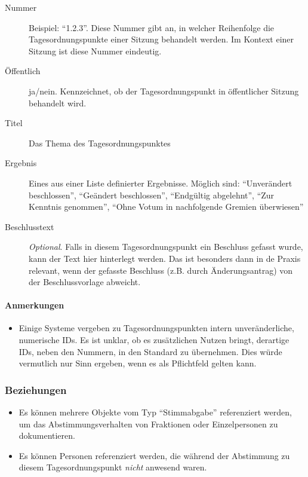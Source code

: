 \begin{description}
\item[Nummer]
Beispiel: ``1.2.3''. Diese Nummer gibt an, in welcher Reihenfolge die
Tagesordnungspunkte einer Sitzung behandelt werden. Im Kontext einer
Sitzung ist diese Nummer eindeutig.
\item[Öffentlich]
ja/nein. Kennzeichnet, ob der Tagesordnungspunkt in öffentlicher Sitzung
behandelt wird.
\item[Titel]
Das Thema des Tagesordnungspunktes
\item[Ergebnis]
Eines aus einer Liste definierter Ergebnisse. Möglich sind:
``Unverändert beschlossen'', ``Geändert beschlossen'', ``Endgültig
abgelehnt'', ``Zur Kenntnis genommen'', ``Ohne Votum in nachfolgende
Gremien überwiesen''
\item[Beschlusstext]
\emph{Optional}. Falls in diesem Tagesordnungspunkt ein Beschluss
gefasst wurde, kann der Text hier hinterlegt werden. Das ist besonders
dann in de Praxis relevant, wenn der gefasste Beschluss (z.B. durch
Änderungsantrag) von der Beschlussvorlage abweicht.
\end{description}

\paragraph{Anmerkungen}

\begin{itemize}
\item
  Einige Systeme vergeben zu Tagesordnungspunkten intern
  unveränderliche, numerische IDs. Es ist unklar, ob es zusätzlichen
  Nutzen bringt, derartige IDs, neben den Nummern, in den Standard zu
  übernehmen. Dies würde vermutlich nur Sinn ergeben, wenn es als
  Pflichtfeld gelten kann.
\end{itemize}

\subsubsection{Beziehungen}

\begin{itemize}
\item
  Es können mehrere Objekte vom Typ ``Stimmabgabe'' referenziert werden,
  um das Abstimmungsverhalten von Fraktionen oder Einzelpersonen zu
  dokumentieren.
\item
  Es können Personen referenziert werden, die während der Abstimmung zu
  diesem Tagesordnungspunkt \emph{nicht} anwesend waren.
\end{itemize}

